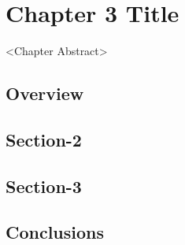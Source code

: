 %
%



\chapter{Chapter 3 Title}
<Chapter Abstract>

\section{Overview}


\section{Section-2}


\section{Section-3}


\section{Conclusions}
